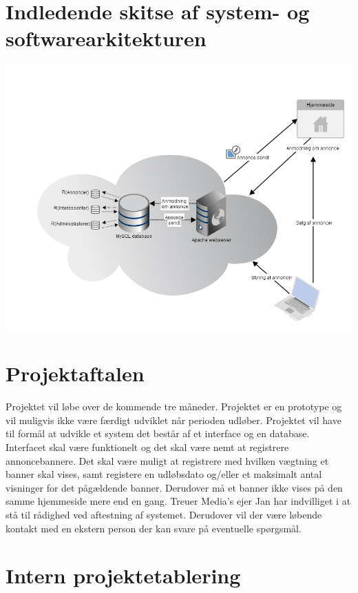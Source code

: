 \documentclass[a4paper,12pt]{article}
\begin{document}
\section{Indledende skitse af system- og softwarearkitekturen}

\includegraphics[width=\textwidth,height=\textheight,keepaspectratio]{architecture_diagram.png}

\section{Projektaftalen}

Projektet vil løbe over de kommende tre måneder. Projektet er en prototype og vil muligvis ikke være færdigt udviklet når perioden udløber. Projektet vil have til formål at udvikle et system det består af et interface og en database.  Interfacet skal være funktionelt og det skal være nemt at registrere annoncebannere. Det skal være muligt at registrere med hvilken vægtning et banner skal vises, samt registere en udløbsdato og/eller et maksimalt antal visninger for det pågældende banner. Derudover må et banner ikke vises på den samme hjemmeside mere end en gang.
Treuer Media's ejer Jan har indvilliget i at stå til rådighed ved aftestning af systemet. Derudover vil der være løbende kontakt med en ekstern person der kan svare på eventuelle spørgsmål.   

\section{Intern projektetablering}
\end{document}
